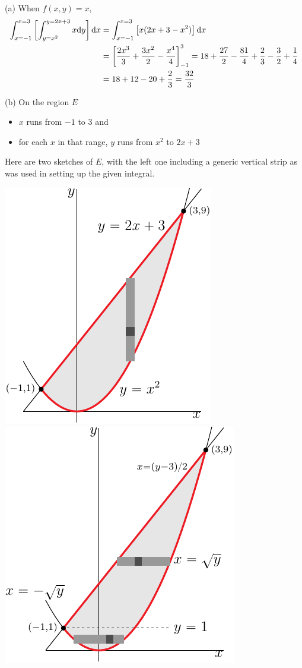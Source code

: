 \begin{solution}
(a) When $f(x,y)=x$,
\begin{align*}
\int_{x=-1}^{x=3}\left[\int_{y=x^2}^{y=2x+3} x \mathrm{d}y\right] \mathrm{d}x
&= \int_{x=-1}^{x=3}\left[x(2x+3-x^2) \right] \mathrm{d}x \\
&=\left[\frac{2x^3}{3}+\frac{3x^2}{2}-\frac{x^4}{4}\right]_{-1}^3
=18+\frac{27}{2}-\frac{81}{4} +\frac{2}{3}-\frac{3}{2}+\frac{1}{4} \\
&=18+12-20+\frac{2}{3}
=\frac{32}{3}
\end{align*}

(b) On the region $E$
\begin{itemize}
\item
 $x$ runs from $-1$ to $3$ and
\item
 for each $x$ in that range, $y$ runs from $x^2$ to $2x+3$
\end{itemize}
Here are two sketches of $E$, with the left one including a generic 
vertical strip as was used in setting up the given integral.
\begin{center}
     \includegraphics{fig/OE07A_7v.pdf}\qquad
     \includegraphics{fig/OE07A_7h.pdf}
\end{center}


\end{solution}
